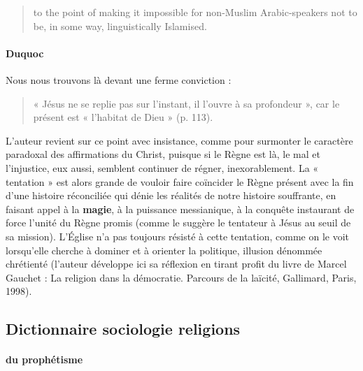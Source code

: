 \begin{quote}
to the point of making it impossible for non-Muslim Arabic-speakers not to be, in some way, linguistically Islamised.
 


\end{quote}

\paragraph{Duquoc} Nous nous trouvons là devant une ferme conviction :

\begin{quote}
    « Jésus ne se replie pas sur l’instant, il l’ouvre à sa profondeur », car le présent est « l’habitat de Dieu » (p. 113).
\end{quote} 
L’auteur revient sur ce point avec insistance, comme pour surmonter le caractère paradoxal des affirmations du Christ, puisque si le Règne est là, le mal et l’injustice, eux aussi, semblent continuer de régner, inexorablement. La « tentation » est alors grande de vouloir faire coïncider le Règne présent avec la fin d’une histoire réconciliée qui dénie les réalités de notre histoire souffrante, en faisant appel à la \textbf{magie}, à la puissance messianique, à la conquête instaurant de force l’unité du Règne promis (comme le suggère le tentateur à Jésus au seuil de sa mission). L’Église n’a pas toujours résisté à cette tentation, comme on le voit lorsqu’elle cherche à dominer et à orienter la politique, illusion dénommée chrétienté (l’auteur développe ici sa réflexion en tirant profit du livre de Marcel Gauchet : La religion dans la démocratie. Parcours de la laïcité, Gallimard, Paris, 1998).  

\subsection{Dictionnaire sociologie religions}

 \paragraph{du prophétisme }
 
